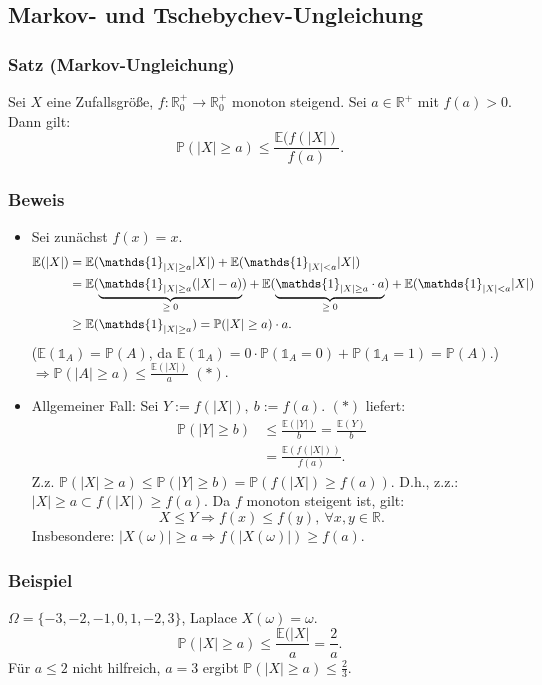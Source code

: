 \subsection{Markov- und Tschebychev-Ungleichung}
\subsubsection{Satz (Markov-Ungleichung)}
Sei $X$ eine Zufallsgr\"o\ss{}e, $f\colon\mathbb{R}^+_0\to\mathbb{R}^+_0$ monoton steigend. Sei $a\in\mathbb{R}^+$ mit $f(a)>0$. Dann gilt:
\[
\mathbb{P}(|X|\geq a)\leq\frac{\mathbb{E}(f(|X|)}{f(a)}.
\]
\subsubsection{Beweis}
\begin{itemize}
\item Sei zun\"achst $f(x)=x$.
\begin{align*}
\mathbb{E}(|X|)&=\mathbb{E}(\mathds{1}_{|X|\geq a}|X|)+\mathbb{E}(\mathds{1}_{|X|<a}|X|)\\
&=\mathbb{E}(\ubr{\mathds{1}_{|X|\geq a}(|X|-a)}{$\geq0$})+\mathbb{E}(\ubr{\mathds{1}_{|X|\geq a}\cdot a}{$\geq0$})+\mathbb{E}(\mathds{1}_{|X|<a}|X|)\\
&\geq\mathbb{E}(\mathds{1}_{|X|\geq a})=\mathbb{P}(|X|\geq a)\cdot a.
\end{align*}
($\mathbb{E}(\mathds{1}_A)=\mathbb{P}(A)$, da $\mathbb{E}(\mathds{1}_A)=0\cdot\mathbb{P}(\mathds{1}_A=0)+\mathbb{P}(\mathds{1}_A=1)=\mathbb{P}(A)$.) $\Rightarrow\mathbb{P}(|A|\geq a)\leq\frac{\mathbb{E}(|X|)}{a}$ $(*)$.
\item Allgemeiner Fall: Sei $Y:=f(|X|),\ b:=f(a)$. $(*)$ liefert:
\begin{align*}
\mathbb{P}(|Y|\geq b)&\leq\frac{\mathbb{E}(|Y|)}{b}=\frac{\mathbb{E}(Y)}{b}\\
&=\frac{\mathbb{E}(f(|X|))}{f(a)}.
\end{align*}
Z.z. $\mathbb{P}(|X|\geq a)\leq\mathbb{P}(|Y|\geq b)=\mathbb{P}(f(|X|)\geq f(a))$. D.h., z.z.: $|X|\geq a\subset f(|X|)\geq f(a)$. Da $f$ monoton steigent ist, gilt:
\[
X\leq Y\Rightarrow f(x)\leq f(y),\ \forall x,y\in\mathbb{R}.
\]
Insbesondere: $|X(\omega)|\geq a\Rightarrow f(|X(\omega)|)\geq f(a)$.
\end{itemize}
\subsubsection{Beispiel}
$\Omega=\{-3,-2,-1,0,1,-2,3\}$, Laplace $X(\omega)=\omega$.
\[
\mathbb{P}(|X|\geq a)\leq\frac{\mathbb{E}(|X|}{a}=\frac{2}{a}.
\]
F\"ur $a\leq 2$ nicht hilfreich, $a=3$ ergibt $\mathbb{P}(|X|\geq a)\leq\frac{2}{3}$.
